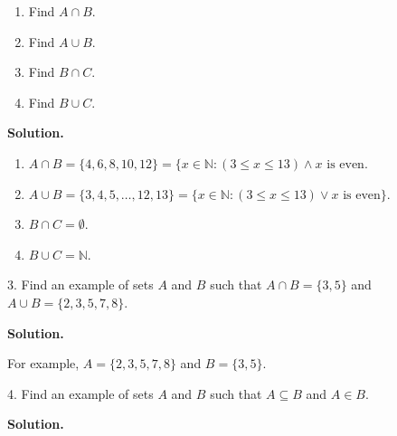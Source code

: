 \documentclass[10pt,]{book}
\theoremstyle{plain}
\theoremstyle{definition}
\theoremstyle{definition}
\theoremstyle{definition}
\numberwithin{equation}{section}
\def\N{\mathbb N}
\def\st{:}
\begin{document}
\begin{exerciselist}
\begin{enumerate}[label=(\alph*)]
\item\hypertarget{li-242}{} Find \(A \cap B\). %
\item\hypertarget{li-243}{} Find \(A \cup B\). %
\item\hypertarget{li-244}{} Find \(B \cap C\). %
\item\hypertarget{li-245}{} Find \(B \cup C\). %
\end{enumerate}
\par\smallskip
\par\smallskip
\noindent\textbf{Solution.}\hypertarget{solution-24}{}\quad
\leavevmode%
\begin{enumerate}[label=(\alph*)]
\item\hypertarget{li-246}{}\(A \cap B = \{4,6,8,10,12\} = \{x \in \N \st (3 \le x \le 13) \wedge x \mbox{ is even}\).%
\item\hypertarget{li-247}{}\(A \cup B = \{3, 4, 5, \ldots, 12, 13\} = \{x \in \N \st (3 \le x \le 13) \vee x \mbox{ is even} \}\). %
\item\hypertarget{li-248}{}\(B \cap C = \emptyset\).%
\item\hypertarget{li-249}{}\(B \cup C = \N\).%
\end{enumerate}
\item[3.]\hypertarget{exercise-13}{}
          Find an example of sets \(A\) and \(B\) such that \(A\cap B = \{3, 5\}\) and \(A \cup B = \{2, 3, 5, 7, 8\}\).
\par\smallskip
\par\smallskip
\noindent\textbf{Solution.}\hypertarget{solution-25}{}\quad

          For example, \(A = \{2,3,5,7,8\}\) and \(B = \{3,5\}\).
\item[4.]\hypertarget{exercise-14}{}
          Find an example of sets \(A\) and \(B\) such that \(A \subseteq B\) and \(A \in B\).
\par\smallskip
\par\smallskip
\noindent\textbf{Solution.}\hypertarget{solution-26}{}\quad


\end{exerciselist}
\end{document}
